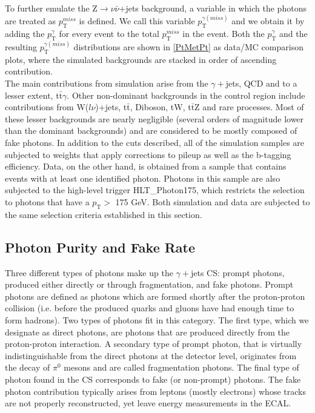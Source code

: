 To further emulate the Z$\rightarrow\nu\bar{\nu}$+jets background, a variable in which the photons are treated as $p_\text{T}^{miss}$ is defined. We call this variable $p_\text{T}^{\gamma (miss)}$ and we obtain it by adding the $p_\text{T}^{\gamma}$ for every event to the total $p_\text{T}^{miss}$ in the event. Both the $p_\text{T}^{\gamma}$ and the resulting $p_\text{T}^{\gamma (miss)}$ distributions are shown in \autoref{PtMetPt} as data/MC comparison plots, where the simulated backgrounds are stacked in order of ascending contribution.\\

The main contributions from simulation arise from the $\gamma+$jets, QCD and to a lesser extent, t$\bar{\text{t}}\gamma$. Other non-dominant backgrounds in the control region include contributions from W($l\nu$)+jets, t$\bar{\text{t}}$, Diboson, tW, t$\bar{\text{t}}$Z and rare processes. Most of these lesser backgrounds are nearly negligible (several orders of magnitude lower than the dominant backgrounds) and are considered to be mostly composed of fake photons. In addition to the cuts described, all of the simulation samples are subjected to weights that apply corrections to pileup as well as the b-tagging efficiency. Data, on the other hand, is obtained from a sample that contains events with at least one identified photon. Photons in this sample are also subjected to the high-level trigger HLT\_Photon175, which restricts the selection to photons that have a $p_\text{T} >$ 175 GeV. Both simulation and data are subjected to the same selection criteria established in this section. 

\subsection{Photon Purity and Fake Rate}\label{purity&fakerate}

Three different types of photons make up the $\gamma+$jets CS: prompt photons, produced either directly or through fragmentation, and fake photons. Prompt photons are defined as photons which are formed shortly after the proton-proton collision (i.e. before the produced quarks and gluons have had enough time to form hadrons). Two types of photons fit in this category. The first type, which we designate as direct photons, are photons that are produced directly from the proton-proton interaction\cite{promptPho}. A secondary type of prompt photon, that is virtually indistinguishable from the direct photons at the detector level, originates from the decay of $\pi^0$ mesons and are called fragmentation photons. The final type of photon found in the CS corresponds to fake (or non-prompt) photons. The fake photon contribution typically arises from leptons (mostly electrons) whose tracks are not properly reconstructed, yet leave energy measurements in the ECAL.

